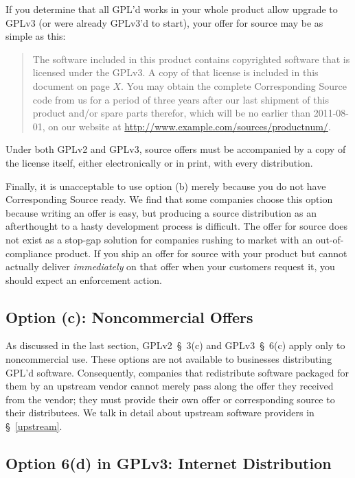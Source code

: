 If you determine that all GPL'd works in your whole product allow upgrade
to GPLv3 (or were already GPLv3'd to start), your offer for source may be
as simple as this:

\begin{quote}
The software included in this product contains copyrighted software that
is licensed under the GPLv3\@.  A copy of that license is included in this
document on page $X$\@.  You may obtain the complete Corresponding Source
code from us for a period of three years after our last shipment of this
product and/or spare parts therefor, which will be no earlier than
2011-08-01, on our website at
\url{http://www.example.com/sources/productnum/}.
\end{quote}

\medskip

Under both GPLv2 and GPLv3, source offers must be accompanied by a copy of
the license itself, either electronically or in print, with every
distribution.
 
Finally, it is unacceptable to use option (b) merely because you do not have
Corresponding Source ready.  We find that some companies choose this option
because writing an offer is easy, but producing a source distribution as
an afterthought to a hasty development process is difficult.  The offer
for source does not exist as a stop-gap solution for companies rushing to
market with an out-of-compliance product.  If you ship an offer for source
with your product but cannot actually deliver \emph{immediately} on that
offer when your customers request it, you should expect an enforcement
action.

\subsection{Option (c): Noncommercial Offers}

As discussed in the last section, GPLv2~\S~3(c) and GPLv3~\S~6(c) apply
only to noncommercial use.  These options are not available to businesses
distributing GPL'd software.  Consequently, companies that redistribute
software packaged for them by an upstream vendor cannot merely pass along
the offer they received from the vendor; they must provide their own offer
or corresponding source to their distributees.  We talk in detail about
upstream software providers in \S~\ref{upstream}.

\subsection{Option 6(d) in GPLv3: Internet Distribution}

